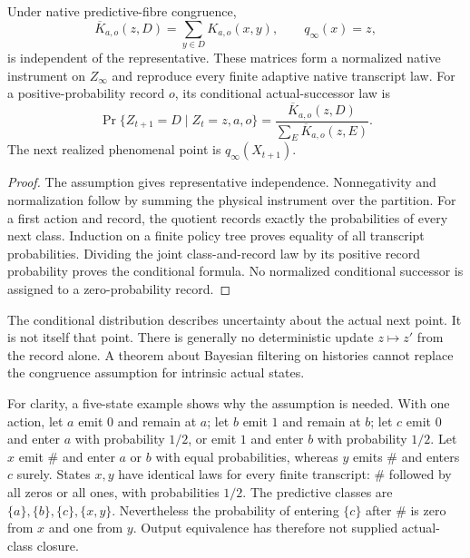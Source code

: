\begin{theorem}
\label{thm:spc2-quotient-instrument}
Under native predictive-fibre congruence,
\[
 \overline K_{a,o}(z,D)=\sum_{y\in D}K_{a,o}(x,y),
 \qquad q_\infty(x)=z,
\]
is independent of the representative. These matrices form a
normalized native instrument on $Z_\infty$ and reproduce every
finite adaptive native transcript law. For a positive-probability
record $o$, its conditional actual-successor law is
\[
 \Pr\{Z_{t+1}=D\mid Z_t=z,a,o\}
 =\frac{\overline K_{a,o}(z,D)}
 {\sum_E\overline K_{a,o}(z,E)}.
\]
The next realized phenomenal point is $q_\infty(X_{t+1})$.
\end{theorem}
\begin{proof}
The assumption gives representative independence. Nonnegativity and
normalization follow by summing the physical instrument over the
partition. For a first action and record, the quotient records exactly
the probabilities of every next class. Induction on a finite policy
tree proves equality of all transcript probabilities. Dividing the
joint class-and-record law by its positive record probability proves
the conditional formula. No normalized conditional successor is
assigned to a zero-probability record.
\end{proof}

The conditional distribution describes uncertainty about the actual
next point. It is not itself that point. There is generally no
deterministic update $z\mapsto z'$ from the record alone. A theorem
about Bayesian filtering on histories cannot replace the congruence
assumption for intrinsic actual states.

For clarity, a five-state example shows why the assumption is needed.
With one action, let $a$ emit $0$ and remain at $a$; let $b$ emit $1$
and remain at $b$; let $c$ emit $0$ and enter $a$ with probability
$1/2$, or emit $1$ and enter $b$ with probability $1/2$. Let $x$ emit
$\#$ and enter $a$ or $b$ with equal probabilities, whereas $y$ emits
$\#$ and enters $c$ surely. States $x,y$ have identical laws for
every finite transcript: $\#$ followed by all zeros or all ones,
with probabilities $1/2$. The predictive classes are
$\{a\},\{b\},\{c\},\{x,y\}$. Nevertheless the probability of
entering $\{c\}$ after $\#$ is zero from $x$ and one from $y$.
Output equivalence has therefore not supplied actual-class closure.

